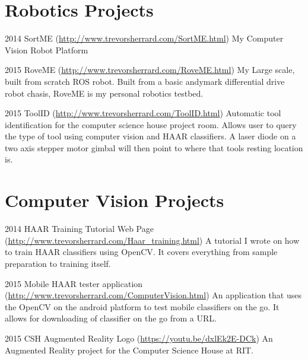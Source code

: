 \documentclass{tccv}
\begin{document}
\section{Robotics Projects}

\begin{yearlist}

\item{2014}
     {SortME (\href{http://www.trevorsherrard.com/SortME.html}{http://www.trevorsherrard.com\newline/SortME.html})}
     {My Computer Vision Robot Platform}
     
\item{2015}
     {RoveME (\href{http://www.trevorsherrard.com/RoveME.html}{http://www.trevorsherrard.com\newline/RoveME.html})}
     {My Large scale, built from scratch ROS robot. Built from a basic andymark differential drive robot chasis, RoveME is my personal robotics testbed.}
     
\item{2015}
	{ToolID (\href{http://www.trevorsherrard.com/ToolID.html}
	{http://www.trevorsherrard.com\newline/ToolID.html})}
	{Automatic tool identification for the computer science house project room. Allows user to query the type of tool using computer vision and HAAR classifiers. A laser diode on a two axis stepper motor gimbal will then point to where that tools resting location is.}
 

\end{yearlist}


\section{Computer Vision Projects}

\begin{yearlist}

\item{2014}
     {HAAR Training Tutorial Web Page (\href{http://www.trevorsherrard.com/Haar_training.html}{http://www.trevorsherrard.com\newline/Haar\_training.html})}
     {A tutorial I wrote on how to train HAAR classifiers using OpenCV. It covers everything from sample preparation to training itself.}
     
\item{2015}
     {Mobile HAAR tester application (\href{http://www.trevorsherrard.com/ComputerVision.html}{http://www.trevorsherrard.com\newline/ComputerVision.html})}
     {An application that uses the OpenCV on the android platform to test mobile classifiers on the go. It allows for downloading of classifier on the go from a URL.}
     
\item{2015}
     {CSH Augmented Reality Logo (\href{https://youtu.be/dxlEk2E-DCk}{https://youtu.be/dxlEk2E-DCk})}
     {An Augmented Reality project for the Computer Science House at RIT.}

\end{yearlist}
\end{document}
